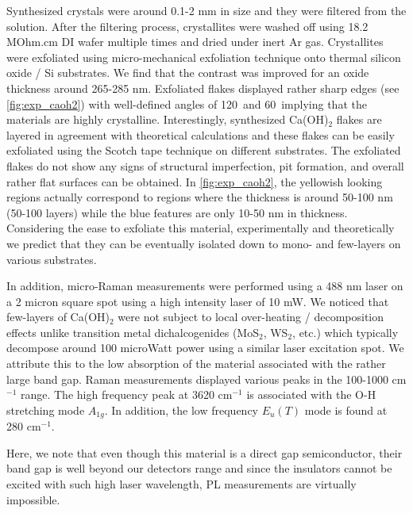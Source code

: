 Synthesized crystals were around 0.1-2 mm in size and they 
were filtered from the solution. After the filtering process, crystallites were 
washed off using 18.2 MOhm.cm DI wafer multiple times and dried under inert Ar 
gas. Crystallites were exfoliated using micro-mechanical exfoliation technique 
onto thermal silicon oxide / Si substrates. We find that the contrast 
was improved for an oxide thickness around 265-285 nm.
Exfoliated flakes displayed rather sharp edges (see \autoref{fig:exp_caoh2}) with 
well-defined angles of 120\textdegree ~and 60\textdegree ~implying that the 
materials are highly crystalline. Interestingly, synthesized Ca(OH)$_{2}$ flakes 
are layered in agreement with theoretical calculations and these flakes can be 
easily exfoliated using the Scotch tape technique on different substrates. 
The exfoliated flakes do not show any signs of structural imperfection, pit 
formation, and overall rather flat surfaces can be obtained. In \autoref{fig:exp_caoh2}, the 
yellowish looking regions actually correspond to regions where the thickness is 
around 50-100 nm (50-100 layers) while the blue features are only 10-50 nm in 
thickness. Considering the ease to exfoliate this material, experimentally and 
theoretically we predict that they can be eventually isolated down to mono- and 
few-layers on various substrates.

In addition, micro-Raman measurements were performed using a 488 nm laser on a 
2 micron square spot using a high intensity laser of 10 mW. We noticed that 
few-layers of Ca(OH)$_{2}$ were not subject to local over-heating / 
decomposition effects unlike transition metal dichalcogenides (MoS$_2$, 
WS$_2$, etc.) which typically decompose around 100 microWatt power using a 
similar laser excitation spot. We attribute this to the low absorption of the 
material associated with the rather large band gap. Raman measurements 
displayed various peaks in the 100-1000 cm$^{-1}$ range. The high frequency peak 
at 3620 cm$^{-1}$ is associated with the O-H stretching mode $A_{1g}$. In 
addition, the low frequency $E_u(T)$ mode is found at 280 cm$^{-1}$.  

Here, we note that even though this material is a direct gap semiconductor, 
their band gap is well beyond our detectors range and since the insulators 
cannot be excited with such high laser wavelength, PL measurements are 
virtually impossible.



